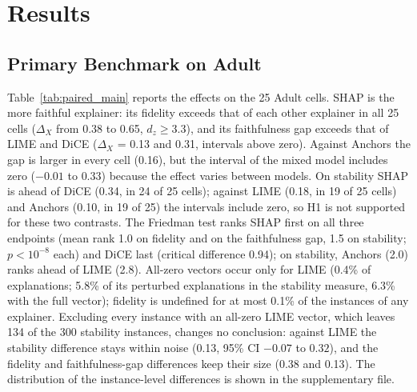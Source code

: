 \documentclass[11pt,a4paper]{article}
\begin{document}
\section{Results}
\label{sec:results}

\subsection{Primary Benchmark on Adult}
\label{sec:main}

Table~\ref{tab:paired_main} reports the effects on the 25 Adult cells.
SHAP is the more faithful explainer: its fidelity exceeds that of each
other explainer in all 25 cells ($\Delta_X$ from 0.38 to 0.65, $d_z \ge
3.3$), and its faithfulness gap exceeds that of LIME and DiCE ($\Delta_X$ =
0.13 and 0.31, intervals above zero). Against Anchors the gap is larger in
every cell (0.16), but the interval of the mixed model includes zero
($-0.01$ to $0.33$) because the effect varies between models. On stability
SHAP is ahead of DiCE (0.34, in 24 of 25 cells); against LIME (0.18, in 19
of 25 cells) and Anchors (0.10, in 19 of 25) the intervals include zero, so
H1 is not supported for these two contrasts. The Friedman test ranks SHAP
first on all three endpoints (mean rank 1.0 on fidelity and on the
faithfulness gap, 1.5 on stability; $p < 10^{-8}$ each) and DiCE last
(critical difference 0.94); on stability, Anchors (2.0) ranks ahead of
LIME (2.8). All-zero vectors occur only for LIME (0.4\% of explanations;
5.8\% of its perturbed explanations in the stability measure, 6.3\% with
the full vector); fidelity is undefined for at most 0.1\% of the instances
of any explainer. Excluding every instance with an all-zero LIME vector,
which leaves 134 of the 300 stability instances, changes no conclusion:
against LIME the stability difference stays within noise (0.13, 95\% CI
$-0.07$ to $0.32$), and the fidelity and faithfulness-gap differences keep
their size (0.38 and 0.13). The distribution of the instance-level differences is shown in
the supplementary file.
\end{document}
